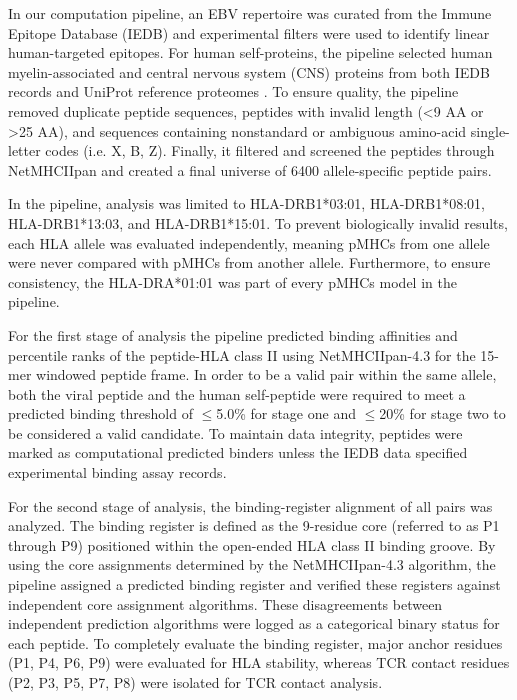 \documentclass[11pt]{article}
\begin{document}
In our computation pipeline, an EBV repertoire was curated from the Immune Epitope Database (IEDB) \cite{iedb} and experimental filters were used to identify linear human-targeted epitopes. For human self-proteins, the pipeline selected human myelin-associated and central nervous system (CNS) proteins from both IEDB records and UniProt reference proteomes \cite{uniprot}. To ensure quality, the pipeline removed duplicate peptide sequences, peptides with invalid length (<9 AA or >25 AA), and sequences containing nonstandard or ambiguous amino-acid single-letter codes (i.e. X, B, Z). Finally, it filtered and screened the peptides through NetMHCIIpan and created a final universe of 6400 allele-specific peptide pairs.

In the pipeline, analysis was limited to HLA-DRB1*03:01, HLA-DRB1*08:01, HLA-DRB1*13:03, and HLA-DRB1*15:01. To prevent biologically invalid results, each HLA allele was evaluated independently, meaning pMHCs from one allele were never compared with pMHCs from another allele. Furthermore, to ensure consistency, the HLA-DRA*01:01 was part of every pMHCs model in the pipeline.

For the first stage of analysis the pipeline predicted binding affinities and percentile ranks of the peptide-HLA class II using NetMHCIIpan-4.3 \cite{netmhc} for the 15-mer windowed peptide frame. In order to be a valid pair within the same allele, both the viral peptide and the human self-peptide were required to meet a predicted binding threshold of $\leq$5.0\% for stage one and $\leq$20\% for stage two to be considered a valid candidate. To maintain data integrity, peptides were marked as computational predicted binders unless the IEDB data specified experimental binding assay records.

For the second stage of analysis, the binding-register alignment of all pairs was analyzed. The binding register is defined as the 9-residue core (referred to as P1 through P9) positioned within the open-ended HLA class II binding groove. By using the core assignments determined by the NetMHCIIpan-4.3 algorithm, the pipeline assigned a predicted binding register and verified these registers against independent core assignment algorithms. These disagreements between independent prediction algorithms were logged as a categorical binary status for each peptide. To completely evaluate the binding register, major anchor residues (P1, P4, P6, P9) were evaluated for HLA stability, whereas TCR contact residues (P2, P3, P5, P7, P8) were isolated for TCR contact analysis.
\end{document}
